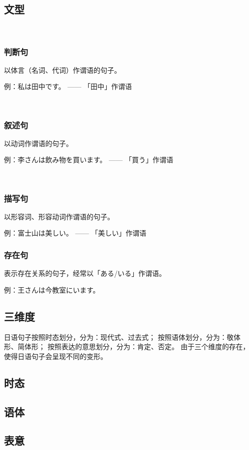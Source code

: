 \chapter{}
\newpage

\section{文型}

　　\subsection{判断句}

    以体言（名词、代词）作谓语的句子。
    
    例：私は田中です。
    —— 「田中」作谓语

　　\subsection{叙述句}

    以动词作谓语的句子。
    
    例：李さんは飲み物を買います。
    —— 「買う」作谓语


　　\subsection{描写句}

    以形容词、形容动词作谓语的句子。
    
    例：富士山は美しい。
    —— 「美しい」作谓语

    \subsection{存在句}
    
    表示存在关系的句子，经常以「ある/いる」作谓语。
    
    例：王さんは今教室にいます。

    \section{三维度}

    日语句子按照时态划分，分为：现代式、过去式；
    按照语体划分，分为：敬体形、简体形；
    按照表达的意思划分，分为：肯定、否定。
    由于三个维度的存在，使得日语句子会呈现不同的变形。

    \section{时态}

    \section{语体}

    \section{表意}

\newpage